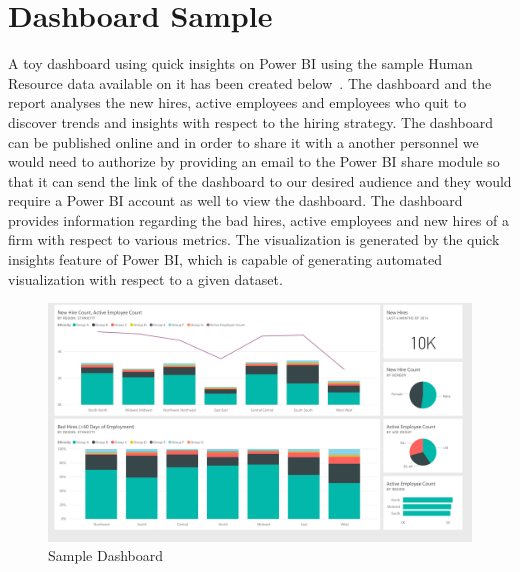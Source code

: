  
\section{Dashboard Sample}
A toy dashboard using quick insights on Power BI using the sample Human 
Resource data available on it has been created below~\cite{hid-sp18-418-powerbi-sample-dataset}.
The dashboard and the report analyses the new hires, active employees and employees 
who quit to discover trends and insights with respect to the hiring strategy. The 
dashboard can be published online and in order to share it with a another personnel 
we would need to authorize by providing an email to the Power BI share module so that 
it can send the link of the dashboard to our desired audience and they would require 
a Power BI account as well to view the dashboard. The dashboard provides information 
regarding the bad hires, active employees and new hires of a firm with respect to various 
metrics. The visualization is generated by the quick insights feature of Power BI, 
which is capable of generating automated visualization with respect to a given dataset.

\begin{figure}[!ht]
\centering\includegraphics[width=\columnwidth]{../images/dashboard.png}
\caption{Sample Dashboard~\cite{hid-sp18-418-powerbi-sample-dashboard}}
\label{f:Dashboard}
\end{figure}

